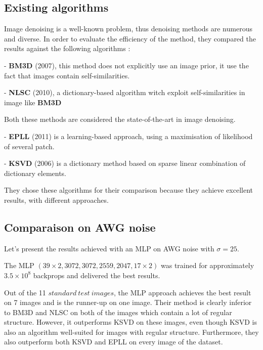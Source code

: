 \documentclass[10pt,a4paper]{article}
\newcommand{\svs}{\vspace{9pt}}
\begin{document}


\subsection{Existing algorithms}

Image denoising is a well-known problem, thus denoising methods are numerous and diverse. In order to evaluate the efficiency of the method, they compared the results against the following algorithms :

\svs
- \textbf{BM3D} (2007), this method does not explicitly use an image prior, it use the fact that images contain self-similarities.

- \textbf{NLSC} (2010), a dictionary-based algorithm witch exploit self-similarities in image like \textbf{BM3D}

Both these methods are considered the state-of-the-art in image denoising.

- \textbf{EPLL} (2011) is a learning-based approach, using a maximisation of likelihood of several patch.

- \textbf{KSVD} (2006) is a dictionary method based on sparse linear combination of dictionary elements.
\svs

They chose these algorithms for their comparison because they achieve excellent results, with different approaches.

\subsection{Comparaison on AWG noise}

Let's present the results achieved with an MLP on AWG noise with $\sigma=25$.

\svs 

The MLP $(39 \times 2, 3072, 3072, 2559, 2047, 17 \times 2)$ was trained for approximately $3.5 \times 10^8$ backprops and delivered the best results.

\svs 

Out of the 11 $standard\ test\ images$, the MLP approach achieves the best result on 7 images and is the runner-up on one image.
Their method is clearly inferior to BM3D and NLSC on both of the images which contain a lot of regular structure. However, it outperforms KSVD on these images, even though KSVD is also an algorithm well-suited for images with regular structure. Furthermore, they also outperform both KSVD and EPLL on every image of the dataset.
\end{document}
